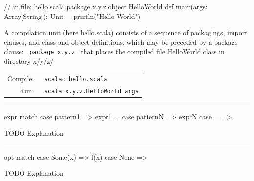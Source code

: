 \documentclass[article, a5paper]{memoir}
\newcommand{\LangColor}{red}
\newcommand{\head}[1]{{\bfseries {\color{\LangColor}{#1}}\par\vspace{1mm}\hrule\vspace{-2mm}}}
\newcommand{\code}{\lstinline[basicstyle=\ttfamily]}
\begin{document}
\vspace{0.5em}\head{Top-level definitions} \vspace{1em}

\begin{minipage}{0.52\linewidth}%
\begin{Code}[frame=single]
// in file: hello.scala
package x.y.z
object HelloWorld {
  def main(args: Array[String]): Unit = { 
    println("Hello World") 
  }
}
\end{Code}%
\end{minipage}%
\hfill\begin{minipage}{0.45\linewidth}
\raggedright{\small
A compilation unit (here hello.scala) consists of a sequence of packagings, import clauses, and class and object definitions, which may be preceded by a package clause: \code| package x.y.z | that places the compiled file HelloWorld.class in directory x/y/z/

\begin{tabular}{r @{}l} \\[-0.5em]
Compile:  & \verb| scalac hello.scala| \\

Run:  &  \verb| scala x.y.z.HelloWorld args| \\
\end{tabular}%
}%
\end{minipage}



\head{Pattern matching and type tests}\vspace{0.5em}
\begin{minipage}{0.3\linewidth}%
\begin{Code}
expr match {
  case pattern1 => expr1
  ...
  case patternN => exprN
  case _ =>
}
\end{Code}
\end{minipage}%
\hfill\begin{minipage}{0.6\linewidth}
\raggedright{\small
TODO Explanation
}%
\end{minipage}

\head{Option, Some, None}\vspace{0.5em}
\begin{minipage}{0.3\linewidth}%
\begin{Code}
opt match {
  case Some(x) => f(x)
  case None =>
}
\end{Code}
\end{minipage}%
\hfill\begin{minipage}{0.6\linewidth}
\raggedright{\small
TODO Explanation
}%
\end{minipage}
\end{document}
